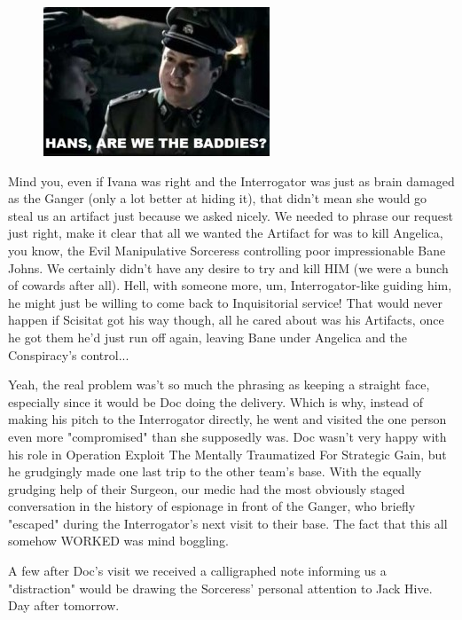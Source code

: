 \begin{figure}
	\begin{center}
		\includegraphics[width=\figwidth]{pics/19/33.png}
	\end{center}
\end{figure}
Mind you, even if Ivana was right and the Interrogator was just as brain damaged as the Ganger (only a lot better at hiding it), that didn't mean she would go steal us an artifact just because we asked nicely. 
We needed to phrase our request just right, make it clear that all we wanted the Artifact for was to kill Angelica, you know, the Evil Manipulative Sorceress controlling poor impressionable Bane Johns. 
We certainly didn't have any desire to try and kill HIM (we were a bunch of cowards after all). 
Hell, with someone more, um, Interrogator-like guiding him, he might just be willing to come back to Inquisitorial service! 
That would never happen if Scisitat got his way though, all he cared about was his Artifacts, once he got them he'd just run off again, leaving Bane under Angelica and the Conspiracy's control...

Yeah, the real problem was't so much the phrasing as keeping a straight face, especially since it would be Doc doing the delivery. 
Which is why, instead of making his pitch to the Interrogator directly, he went and visited the one person even more "compromised" than she supposedly was. 
Doc wasn't very happy with his role in Operation Exploit The Mentally Traumatized For Strategic Gain, but he grudgingly made one last trip to the other team's base. 
With the equally grudging help of their Surgeon, our medic had the most obviously staged conversation in the history of espionage in front of the Ganger, who briefly "escaped" during the Interrogator's next visit to their base. 
The fact that this all somehow WORKED was mind boggling.

A few after Doc's visit we received a calligraphed note informing us a "distraction" would be drawing the Sorceress' personal attention to Jack Hive. 
Day after tomorrow.

